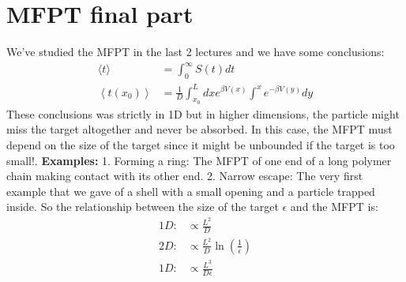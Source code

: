 \documentclass{report}
\begin{document}
\section{MFPT final part}
We've studied the MFPT in the last 2 lectures and we have some conclusions:
\begin{align}
    \langle t\rangle                            & =\int_0^{\infty} S(t) d t                                               \\
    \left\langle t\left(x_0\right)\right\rangle & =\frac{1}{D} \int^L_{x_0} d x e^{\beta V(x)} \int^x e^{-\beta V(y)} d y
\end{align}
These conclusions was strictly in 1D but in higher dimensions, the particle might miss the target altogether and never be absorbed. In this case, the MFPT must depend on the size of the target since it might be unbounded if the target is too small!.
\textbf{Examples:} 1. Forming a ring: The MFPT of one end of a long polymer chain making contact with its other end. 2. Narrow escape: The very first example that we gave of a shell with a small opening and a particle trapped inside.
So the relationship between the size of the target $\epsilon$ and the MFPT is:
\begin{align}
    1D: & \propto \frac{L^2}{D}                         \\
    2D: & \propto \frac{L^2}{D} \ln(\frac{1}{\epsilon}) \\
    1D: & \propto \frac{L^3}{D\epsilon}
\end{align}
\end{document}
